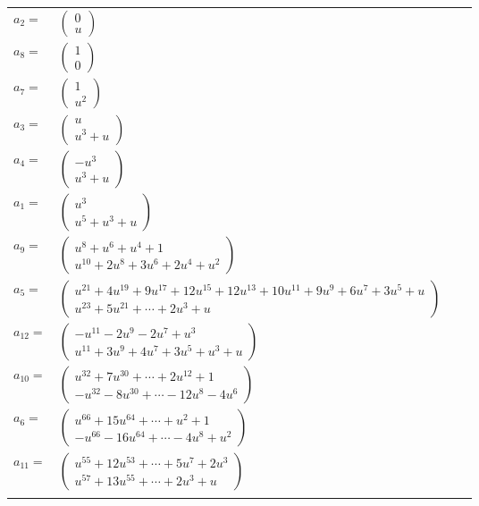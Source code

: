 \documentclass[1p]{elsarticle_modified}
\theoremstyle{definition}
\begin{document}
\begin{tabular}{m{7pt} m{180pt} m{7pt} m{180pt} }
\flushright $a_{2}=$&$\begin{pmatrix}0\\u\end{pmatrix}$ \\
\flushright $a_{8}=$&$\begin{pmatrix}1\\0\end{pmatrix}$ \\
\flushright $a_{7}=$&$\begin{pmatrix}1\\u^2\end{pmatrix}$ \\
\flushright $a_{3}=$&$\begin{pmatrix}u\\u^3+u\end{pmatrix}$ \\
\flushright $a_{4}=$&$\begin{pmatrix}- u^3\\u^3+u\end{pmatrix}$ \\
\flushright $a_{1}=$&$\begin{pmatrix}u^3\\u^5+u^3+u\end{pmatrix}$ \\
\flushright $a_{9}=$&$\begin{pmatrix}u^8+u^6+u^4+1\\u^{10}+2 u^8+3 u^6+2 u^4+u^2\end{pmatrix}$ \\
\flushright $a_{5}=$&$\begin{pmatrix}u^{21}+4 u^{19}+9 u^{17}+12 u^{15}+12 u^{13}+10 u^{11}+9 u^9+6 u^7+3 u^5+u\\u^{23}+5 u^{21}+\cdots+2 u^3+u\end{pmatrix}$ \\
\flushright $a_{12}=$&$\begin{pmatrix}- u^{11}-2 u^9-2 u^7+u^3\\u^{11}+3 u^9+4 u^7+3 u^5+u^3+u\end{pmatrix}$ \\
\flushright $a_{10}=$&$\begin{pmatrix}u^{32}+7 u^{30}+\cdots+2 u^{12}+1\\- u^{32}-8 u^{30}+\cdots-12 u^8-4 u^6\end{pmatrix}$ \\
\flushright $a_{6}=$&$\begin{pmatrix}u^{66}+15 u^{64}+\cdots+u^2+1\\- u^{66}-16 u^{64}+\cdots-4 u^8+u^2\end{pmatrix}$ \\
\flushright $a_{11}=$&$\begin{pmatrix}u^{55}+12 u^{53}+\cdots+5 u^7+2 u^3\\u^{57}+13 u^{55}+\cdots+2 u^3+u\end{pmatrix}$\\&\end{tabular}
\end{document}
